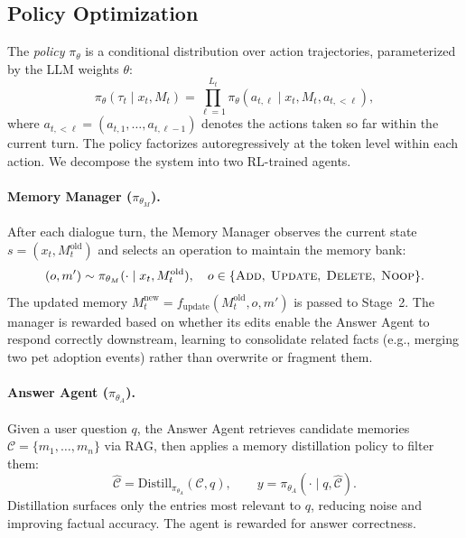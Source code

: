 \documentclass{article}
\theoremstyle{definition}
\begin{document}
\subsection{Policy Optimization}

The \emph{policy} $\pi_\theta$ is a conditional distribution over action trajectories, parameterized by the LLM weights $\theta$:
\begin{equation}
\pi_\theta(\tau_t \mid x_t, M_t) = \prod_{\ell=1}^{L_t} \pi_\theta(a_{t,\ell} \mid x_t, M_t, a_{t,<\ell}),
\end{equation}
where $a_{t,<\ell} = (a_{t,1}, \ldots, a_{t,\ell-1})$ denotes the actions taken so far within the current turn. The policy factorizes autoregressively at the token level within each action. We decompose the system into two RL-trained agents.

\paragraph{Memory Manager ($\pi_{\theta_M}$).}
After each dialogue turn, the Memory Manager observes the current state $s = (x_t, M_t^{\text{old}})$ and selects an operation to maintain the memory bank:
\begin{equation}
(o, m') \sim \pi_{\theta_M}(\cdot \mid x_t, M_t^{\text{old}}), \quad o \in \{\textsc{Add},\; \textsc{Update},\; \textsc{Delete},\; \textsc{Noop}\}.
\end{equation}
The updated memory $M_t^{\text{new}} = f_{\text{update}}(M_t^{\text{old}}, o, m')$ is passed to Stage~2. The manager is rewarded based on whether its edits enable the Answer Agent to respond correctly downstream, learning to consolidate related facts (e.g., merging two pet adoption events) rather than overwrite or fragment them.

\paragraph{Answer Agent ($\pi_{\theta_A}$).}
Given a user question $q$, the Answer Agent retrieves candidate memories $\mathcal{C} = \{m_1, \ldots, m_n\}$ via RAG, then applies a memory distillation policy to filter them:
\begin{equation}
\hat{\mathcal{C}} = \text{Distill}_{\pi_{\theta_A}}(\mathcal{C}, q), \qquad y = \pi_{\theta_A}(\cdot \mid q, \hat{\mathcal{C}}).
\end{equation}
Distillation surfaces only the entries most relevant to $q$, reducing noise and improving factual accuracy. The agent is rewarded for answer correctness.
\end{document}
